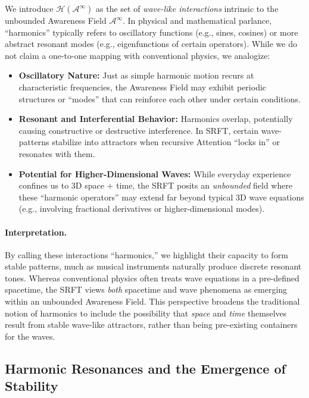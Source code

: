 \documentclass[12pt,a4paper]{article}
\begin{document}
We introduce \(\mathcal{H}(\mathscr{A}^\infty)\) as the set of \emph{wave-like interactions}
intrinsic to the unbounded Awareness Field \(\mathscr{A}^\infty\). In physical and mathematical
parlance, ``harmonics'' typically refers to oscillatory functions (e.g., sines, cosines) or
more abstract resonant modes (e.g., eigenfunctions of certain operators). While we do not
claim a one-to-one mapping with conventional physics, we analogize:
\begin{itemize}
    \item \textbf{Oscillatory Nature:} Just as simple harmonic motion recurs at characteristic
    frequencies, the Awareness Field may exhibit periodic structures or ``modes'' that can
    reinforce each other under certain conditions.
    \item \textbf{Resonant and Interferential Behavior:} Harmonics overlap, potentially causing
    constructive or destructive interference. In SRFT, certain wave-patterns stabilize into
    attractors when recursive Attention ``locks in'' or resonates with them.
    \item \textbf{Potential for Higher-Dimensional Waves:} While everyday experience
    confines us to 3D space + time, the SRFT posits an \emph{unbounded} field where these
    ``harmonic operators'' may extend far beyond typical 3D wave equations (e.g., involving
    fractional derivatives or higher-dimensional modes).
\end{itemize}

\paragraph{Interpretation.}
By calling these interactions ``harmonics,'' we highlight their capacity to form stable
patterns, much as musical instruments naturally produce discrete resonant tones.
Whereas conventional physics often treats wave equations in a pre-defined spacetime,
the SRFT views \emph{both} spacetime and wave phenomena as emerging within an unbounded
Awareness Field. This perspective broadens the traditional notion of harmonics to
include the possibility that \emph{space} and \emph{time} themselves result from stable
wave-like attractors, rather than being pre-existing containers for the waves.

\subsection{Harmonic Resonances and the Emergence of Stability}
\label{subsec:harmonic-resonances}
\end{document}
